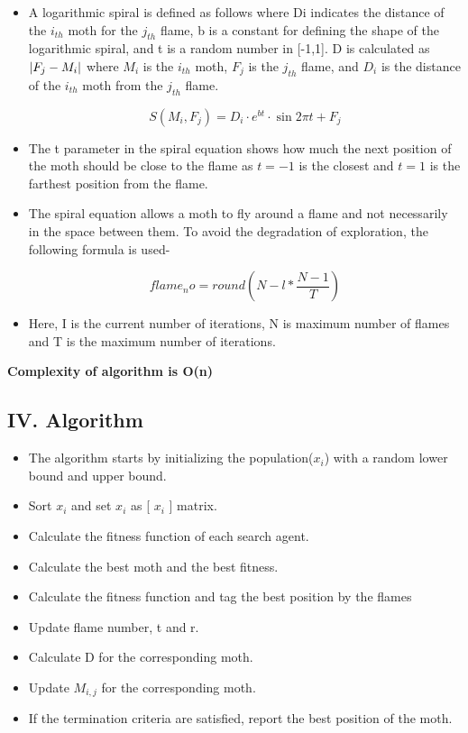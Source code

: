 \documentclass[12pt,a4paper]{report}
\begin{document}
\begin{itemize}
\item A logarithmic spiral is defined as follows where Di indicates the distance of the $i_{th}$ moth for the $j_{th}$ flame, b is a constant for defining the shape of the logarithmic spiral, and t is a random number in [-1,1]. D is calculated as $\abs{F_{j} - M_{i}}$ where $M_{i}$ is the $i_{th}$ moth, $F_{j}$ is the $j_{th}$ flame, and $D_{i}$ is the distance of the $i_{th}$ moth from the $j_{th}$ flame.

$$
S(M_{i},F_{j}) = D_{i} \cdot e^{bt} \cdot \sin{2 \pi t} + F_{j}
$$

\item The t parameter in the spiral equation shows how much the next position of the moth should be close to the flame as $t = -1$ is the closest and $t = 1 $ is the farthest position from the flame. 

\item The spiral equation allows a moth to fly around a flame and not necessarily in the space between them. To avoid the degradation of exploration, the following formula is used- 

$$
flame_no = round(N - l \ast \frac{N - 1}{T}) 
$$

\item Here, I is the current number of iterations, N is maximum number of flames and T is the maximum number of iterations.

\end{itemize}

\textbf{Complexity of algorithm is O(n)} 

\subsection*{IV.\hspace{5pt}	Algorithm}

\begin{itemize}
\item The algorithm starts by initializing the population($x_{i}$) with a random lower bound and upper bound.
\item Sort $x_{i}$ and set $x_{i}$ as [ $x_{i}$ ] matrix.
\item Calculate the fitness function of each search agent.
\item Calculate the best moth and the best fitness.
\item Calculate the fitness function and tag the best position by the flames
\item Update flame number, t and r.
\item Calculate D for the corresponding moth.
\item Update $ M_{i,j}$ for the corresponding moth.
\item If the termination criteria are satisfied, report the best position of the moth.
\end{itemize}
\end{document}
